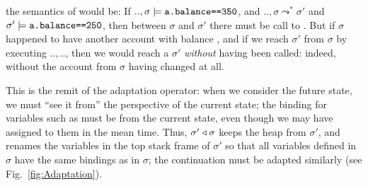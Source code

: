  the semantics of  \Sadapt would be: If
$..,\sigma  \models {\texttt{a.balance==350}}$, 
and  $.., \sigma  \leadsto^* \sigma'$ and $\sigma' \models {\texttt{a.balance==250}}$,
then %
between $\sigma$ and $\sigma'$ there must be
call to   . 
But if $\sigma$ happened to have another account  with balance
, and if we reach $\sigma'$ from $\sigma$ by executing $..,..$, then we would 
reach a $\sigma'$ %
\emph{without}  having been called: indeed, without the
account  from $\sigma$  having changed at all.

This is the remit of the adaptation operator: when we consider the
future state, we must ``see it from'' the perspective of the current
state; the binding for variables such as  must be from the
current state, even though we may have assigned to them in the mean
time.  Thus, $\sigma' \triangleleft \sigma$ keeps the heap from $\sigma'$,
and renames the variables
in the top stack frame of  $\sigma'$ so that all variables defined in $\sigma$ have the same 
bindings
as in   $\sigma$; the continuation must be adapted similarly (see
Fig.~\ref{fig:Adaptation}).
%
%




